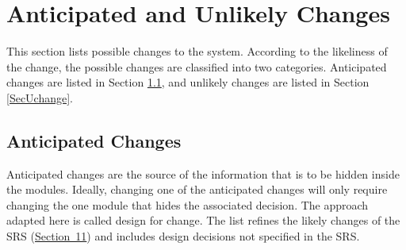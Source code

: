 \documentclass[10pt, titlepage]{article}
\newcommand{\srsurl}{https://team-hindsight.github.io/ophthamology-game/SRS/SRS.pdf}
\newcommand{\srsitemref}[2]{\href{\srsurl\#nameddest=#1}{#2}}
\begin{document}
\newpage

\section{Anticipated and Unlikely Changes} \label{SecChange}

This section lists possible changes to the system. According to the likeliness
of the change, the possible changes are classified into two
categories. Anticipated changes are listed in Section \ref{SecAchange}, and
unlikely changes are listed in Section \ref{SecUchange}.

\subsection{Anticipated Changes} \label{SecAchange}

Anticipated changes are the source of the information that is to be hidden
inside the modules. Ideally, changing one of the anticipated changes will only
require changing the one module that hides the associated decision. The approach
adapted here is called design for change. The list refines the likely changes
of the SRS (\srsitemref{sec_LikelyChanges}{Section~11}) and includes design
decisions not specified in the SRS.
\end{document}
